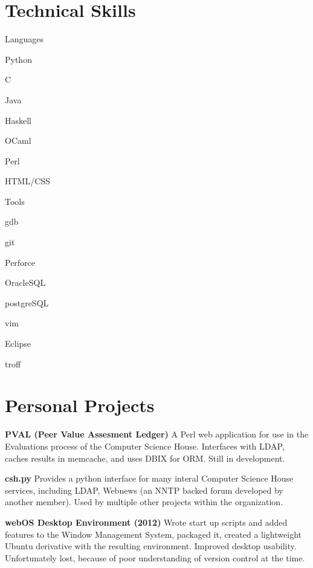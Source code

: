 \documentclass[letter,margin,line]{resume}
\begin{document}
\begin{resume}
\section{\mysidestyle Technical Skills}
	\begin{compactdesc}
	\item[Languages] \begin{inparaenum} { \small
		\item Python
		\item C
		\item Java
		\item Haskell
		\item OCaml
		\item Perl
		\item HTML/CSS
	} \end{inparaenum}
	\item[Tools] \begin{inparaenum} { \small
		\item gdb
		\item git
		\item Perforce
		\item OracleSQL
		\item postgreSQL
		\item vim
		\item Eclipse
		\item troff
	} \end{inparaenum}
	\end{compactdesc}
\section{\mysidestyle Personal Projects}
	\begin{asparablank}
	\item {\bf PVAL (Peer Value Assesment Ledger)}
	\small A Perl web application for use in the Evaluations process of the Computer Science House. Interfaces with
	       LDAP, caches results in memcache, and uses DBIX for ORM. Still in development. 
	\normalsize \\
	\item {\bf csh.py}
	\small Provides a python interface for many interal Computer Science House services, including LDAP, Webnews
               (an NNTP backed forum developed by another member). Used by multiple other projects within the
               organization.
	\normalsize
	\\
	\item {\bf webOS Desktop Environment (2012)}
	\small Wrote start up scripts and added features to the Window Management System, packaged it, 
	       created a lightweight Ubuntu derivative with the resulting environment. Improved desktop usability.  
	       Unfortunately lost, because of poor understanding of version control at the time.
	\normalsize
	\\


\end{asparablank}
\end{resume}
\end{document}

